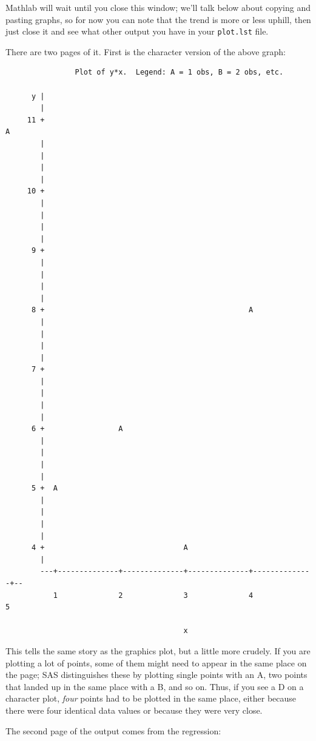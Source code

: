 \documentclass[11pt]{article}
\begin{document}
Mathlab will wait until you close this window; we'll talk below about
copying and pasting graphs, so for now you can note that the trend is
more or less uphill, then just close it and see
what other output you have in your \texttt{plot.lst} file.

There are two pages of it. First is the character version of the above
graph:

\filbreak
{\footnotesize
\begin{verbatim}
                Plot of y*x.  Legend: A = 1 obs, B = 2 obs, etc.

      y |
        |
     11 +                                                              A
        |
        |
        |
        |
     10 +
        |
        |
        |
        |
      9 +
        |
        |
        |
        |
      8 +                                               A
        |
        |
        |
        |
      7 +
        |
        |
        |
        |
      6 +                 A
        |
        |
        |
        |
      5 +  A
        |
        |
        |
        |
      4 +                                A
        |
        ---+--------------+--------------+--------------+--------------+--
           1              2              3              4              5

                                         x
\end{verbatim}
}
\filbreak

This tells the same story as the graphics plot, but a little more
crudely. If you are plotting a lot of points, some of them might need
to appear in the same place on the page; SAS distinguishes these by
plotting single points with an A, two points that landed up in the
same place with a B, and so on. Thus, if you see a D on a character
plot, \emph{four} points had to be plotted in the same place, either
because there were four identical data values or because they were
very close.

The second page of the output comes from the regression:

\filbreak
\end{document}
